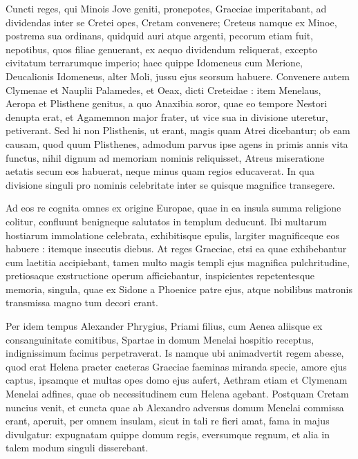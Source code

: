 \documentclass{article}
\begin{document}
\begin{pages}
\begin{Rightside}
\beginnumbering
\autopar

Cuncti reges, qui Minois Jove geniti, pronepotes, Graeciae imperitabant, ad dividendas inter se Cretei opes, Cretam convenere; Creteus namque ex Minoe, postrema sua ordinans, quidquid auri atque argenti, pecorum etiam fuit, nepotibus, quos filiae genuerant, ex aequo dividendum reliquerat, excepto civitatum terrarumque imperio; haec quippe Idomeneus cum Merione, Deucalionis Idomeneus, alter Moli, jussu ejus seorsum habuere. Convenere autem Clymenae et Nauplii Palamedes, et Oeax, dicti Creteidae : item Menelaus, Aeropa et Plisthene genitus, a quo Anaxibia soror, quae eo tempore Nestori denupta erat, et Agamemnon major frater, ut vice sua in divisione uteretur, petiverant. Sed hi non Plisthenis, ut erant, magis quam Atrei dicebantur; ob eam causam, quod quum Plisthenes, admodum parvus ipse agens in primis annis vita functus, nihil dignum ad memoriam nominis reliquisset, Atreus miseratione aetatis secum eos habuerat, neque minus quam regios educaverat. In qua divisione singuli pro nominis celebritate inter se quisque magnifice transegere.

Ad eos re cognita omnes ex origine Europae, quae in ea insula summa religione colitur, confluunt benigneque salutatos in templum deducunt. Ibi multarum hostiarum immolatione celebrata, exhibitisque epulis, largiter magnificeque eos habuere : itemque insecutis diebus. At reges Graeciae, etsi ea quae exhibebantur cum laetitia accipiebant, tamen multo magis templi ejus magnifica pulchritudine, pretiosaque exstructione operum afficiebantur, inspicientes repetentesque memoria, singula, quae ex Sidone a Phoenice patre ejus, atque nobilibus matronis transmissa magno tum decori erant.

Per idem tempus Alexander Phrygius, Priami filius, cum Aenea aliisque ex consanguinitate comitibus, Spartae in domum Menelai hospitio receptus, indignissimum facinus perpetraverat. Is namque ubi animadvertit regem abesse, quod erat Helena praeter caeteras Graeciae faeminas miranda specie, amore ejus captus, ipsamque et multas opes domo ejus aufert, Aethram etiam et Clymenam Menelai adfines, quae ob necessitudinem cum Helena agebant. Postquam Cretam nuncius venit, et cuncta quae ab Alexandro adversus domum Menelai commissa erant, aperuit, per omnem insulam, sicut in tali re fieri amat, fama in majus divulgatur: expugnatam quippe domum regis, eversumque regnum, et alia in talem modum singuli disserebant.



\end{Rightside}
\end{pages}
\end{document}
